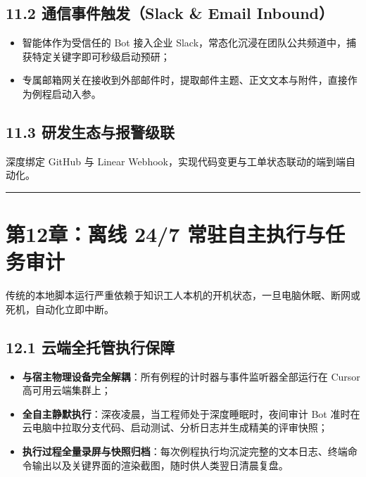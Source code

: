 \documentclass[10.5pt,a4paper,oneside]{report}
\providecommand{\tightlist}{\setlength{\itemsep}{0pt}\setlength{\parskip}{0pt}}
\begin{document}
\subsection{11.2 通信事件触发（Slack \& Email
Inbound）}\label{ux901aux4fe1ux4e8bux4ef6ux89e6ux53d1slack-email-inbound}

\begin{itemize}
\tightlist
\item
  智能体作为受信任的 Bot 接入企业
  Slack，常态化沉浸在团队公共频道中，捕获特定关键字即可秒级启动预研；
\item
  专属邮箱网关在接收到外部邮件时，提取邮件主题、正文文本与附件，直接作为例程启动入参。
\end{itemize}

\subsection{11.3
研发生态与报警级联}\label{ux7814ux53d1ux751fux6001ux4e0eux62a5ux8b66ux7ea7ux8054}

深度绑定 GitHub 与 Linear
Webhook，实现代码变更与工单状态联动的端到端自动化。

\begin{center}\rule{0.5\linewidth}{0.5pt}\end{center}

\section{第12章：离线 24/7
常驻自主执行与任务审计}\label{ux7b2c12ux7ae0ux79bbux7ebf-247-ux5e38ux9a7bux81eaux4e3bux6267ux884cux4e0eux4efbux52a1ux5ba1ux8ba1}

传统的本地脚本运行严重依赖于知识工人本机的开机状态，一旦电脑休眠、断网或死机，自动化立即中断。

\subsection{12.1
云端全托管执行保障}\label{ux4e91ux7aefux5168ux6258ux7ba1ux6267ux884cux4fddux969c}

\begin{itemize}
\tightlist
\item
  \textbf{与宿主物理设备完全解耦}：所有例程的计时器与事件监听器全部运行在
  Cursor 高可用云端集群上；
\item
  \textbf{全自主静默执行}：深夜凌晨，当工程师处于深度睡眠时，夜间审计
  Bot
  准时在云电脑中拉取分支代码、启动测试、分析日志并生成精美的评审快照；
\item
  \textbf{执行过程全量录屏与快照归档}：每次例程执行均沉淀完整的文本日志、终端命令输出以及关键界面的渲染截图，随时供人类翌日清晨复盘。
\end{itemize}
\end{document}
